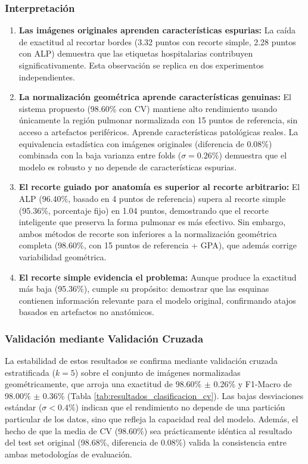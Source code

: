 \subsubsection{Interpretación}

\begin{enumerate}
    \item \textbf{Las imágenes originales aprenden características espurias:} La caída de exactitud al recortar bordes (3.32 puntos con recorte simple, 2.28 puntos con ALP) demuestra que las etiquetas hospitalarias contribuyen significativamente. Esta observación se replica en dos experimentos independientes.

    \item \textbf{La normalización geométrica aprende características genuinas:} El sistema propuesto (98.60\% con CV) mantiene alto rendimiento usando únicamente la región pulmonar normalizada con 15 puntos de referencia, sin acceso a artefactos periféricos. Aprende características patológicas reales. La equivalencia estadística con imágenes originales (diferencia de 0.08\%) combinada con la baja varianza entre folds ($\sigma = 0.26\%$) demuestra que el modelo es robusto y no depende de características espurias.

    \item \textbf{El recorte guiado por anatomía es superior al recorte arbitrario:} El ALP (96.40\%, basado en 4 puntos de referencia) supera al recorte simple (95.36\%, porcentaje fijo) en 1.04 puntos, demostrando que el recorte inteligente que preserva la forma pulmonar es más efectivo. Sin embargo, ambos métodos de recorte son inferiores a la normalización geométrica completa (98.60\%, con 15 puntos de referencia + GPA), que además corrige variabilidad geométrica.

    \item \textbf{El recorte simple evidencia el problema:} Aunque produce la exactitud más baja (95.36\%), cumple su propósito: demostrar que las esquinas contienen información relevante para el modelo original, confirmando atajos basados en artefactos no anatómicos.
\end{enumerate}

\subsubsection{Validación mediante Validación Cruzada}

La estabilidad de estos resultados se confirma mediante validación cruzada estratificada ($k=5$) sobre el conjunto de imágenes normalizadas geométricamente, que arroja una exactitud de 98.60\% $\pm$ 0.26\% y F1-Macro de 98.00\% $\pm$ 0.36\% (Tabla \ref{tab:resultados_clasificacion_cv}). Las bajas desviaciones estándar ($\sigma < 0.4\%$) indican que el rendimiento no depende de una partición particular de los datos, sino que refleja la capacidad real del modelo. Además, el hecho de que la media de CV (98.60\%) sea prácticamente idéntica al resultado del test set original (98.68\%, diferencia de 0.08\%) valida la consistencia entre ambas metodologías de evaluación.

